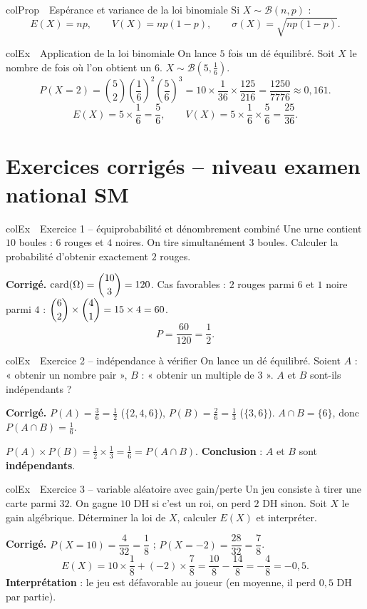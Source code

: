 \documentclass[11pt,a4paper]{article}
\newenvironment{propriete}[1][Propriété]
  {\begin{fiche}{colProp}{\ding{72}~~#1}}{\end{fiche}}
\newenvironment{exemple}[1][Exemple]
  {\begin{fiche}{colEx}{\ding{217}~~#1}}{\end{fiche}}
\begin{document}
\begin{propriete}[Espérance et variance de la loi binomiale]
Si $X\sim\mathcal{B}(n,p)$ :
\[
  E(X) = np, \qquad V(X) = np(1-p), \qquad \sigma(X) = \sqrt{np(1-p)}.
\]
\end{propriete}

\begin{exemple}[Application de la loi binomiale]
On lance $5$ fois un dé équilibré. Soit $X$ le nombre de fois où l'on obtient un $6$. $X\sim\mathcal{B}\left(5,\frac16\right)$.
\[
  P(X=2) = \binom52\left(\frac16\right)^2\left(\frac56\right)^3 = 10\times\frac1{36}\times\frac{125}{216} = \frac{1250}{7776} \approx 0{,}161.
\]
\[
  E(X) = 5\times\frac16 = \frac56, \qquad V(X) = 5\times\frac16\times\frac56 = \frac{25}{36}.
\]
\end{exemple}

\section{Exercices corrigés -- niveau examen national SM}

\begin{exemple}[Exercice 1 -- équiprobabilité et dénombrement combiné]
Une urne contient $10$ boules : $6$ rouges et $4$ noires. On tire simultanément $3$ boules. Calculer la probabilité d'obtenir exactement $2$ rouges.

\smallskip
\textbf{Corrigé.} $\text{card}(\Omega)=\dbinom{10}3=120$. Cas favorables : $2$ rouges parmi $6$ et $1$ noire parmi $4$ : $\dbinom62\times\dbinom41=15\times4=60$.
\[
  P = \frac{60}{120} = \frac12.
\]
\end{exemple}

\begin{exemple}[Exercice 2 -- indépendance à vérifier]
On lance un dé équilibré. Soient $A$ : « obtenir un nombre pair », $B$ : « obtenir un multiple de $3$ ». $A$ et $B$ sont-ils indépendants ?

\smallskip
\textbf{Corrigé.} $P(A)=\frac36=\frac12$ ($\{2,4,6\}$), $P(B)=\frac26=\frac13$ ($\{3,6\}$). $A\cap B=\{6\}$, donc $P(A\cap B)=\frac16$.

\smallskip
$P(A)\times P(B)=\frac12\times\frac13=\frac16=P(A\cap B)$. \textbf{Conclusion} : $A$ et $B$ sont \textbf{indépendants}.
\end{exemple}

\begin{exemple}[Exercice 3 -- variable aléatoire avec gain/perte]
Un jeu consiste à tirer une carte parmi $32$. On gagne $10$ DH si c'est un roi, on perd $2$ DH sinon. Soit $X$ le gain algébrique. Déterminer la loi de $X$, calculer $E(X)$ et interpréter.

\smallskip
\textbf{Corrigé.} $P(X=10)=\dfrac{4}{32}=\dfrac18$ ; $P(X=-2)=\dfrac{28}{32}=\dfrac78$.
\[
  E(X) = 10\times\frac18+(-2)\times\frac78 = \frac{10}8-\frac{14}8 = -\frac48 = -0{,}5.
\]
\textbf{Interprétation} : le jeu est défavorable au joueur (en moyenne, il perd $0{,}5$ DH par partie).
\end{exemple}
\end{document}
